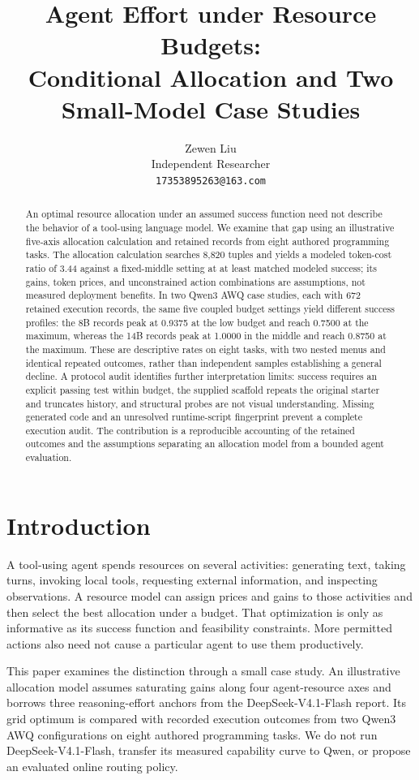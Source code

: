 \documentclass[11pt]{article}
\title{Agent Effort under Resource Budgets:\\Conditional Allocation and Two Small-Model Case Studies}
\author{Zewen Liu \\ Independent Researcher \\ \texttt{17353895263@163.com}}
\date{}
\begin{document}
\maketitle

\begin{abstract}
An optimal resource allocation under an assumed success function need not describe the behavior of a tool-using language model. We examine that gap using an illustrative five-axis allocation calculation and retained records from eight authored programming tasks. The allocation calculation searches 8,820 tuples and yields a modeled token-cost ratio of 3.44 against a fixed-middle setting at at least matched modeled success; its gains, token prices, and unconstrained action combinations are assumptions, not measured deployment benefits. In two Qwen3 AWQ case studies, each with 672 retained execution records, the same five coupled budget settings yield different success profiles: the 8B records peak at 0.9375 at the low budget and reach 0.7500 at the maximum, whereas the 14B records peak at 1.0000 in the middle and reach 0.8750 at the maximum. These are descriptive rates on eight tasks, with two nested menus and identical repeated outcomes, rather than independent samples establishing a general decline. A protocol audit identifies further interpretation limits: success requires an explicit passing test within budget, the supplied scaffold repeats the original starter and truncates history, and structural probes are not visual understanding. Missing generated code and an unresolved runtime-script fingerprint prevent a complete execution audit. The contribution is a reproducible accounting of the retained outcomes and the assumptions separating an allocation model from a bounded agent evaluation.
\end{abstract}

\section{Introduction}
A tool-using agent spends resources on several activities: generating text, taking turns, invoking local tools, requesting external information, and inspecting observations. A resource model can assign prices and gains to those activities and then select the best allocation under a budget. That optimization is only as informative as its success function and feasibility constraints. More permitted actions also need not cause a particular agent to use them productively.

This paper examines the distinction through a small case study. An illustrative allocation model assumes saturating gains along four agent-resource axes and borrows three reasoning-effort anchors from the DeepSeek-V4.1-Flash report\citep{v41flash2026}. Its grid optimum is compared with recorded execution outcomes from two Qwen3 AWQ configurations on eight authored programming tasks. We do not run DeepSeek-V4.1-Flash, transfer its measured capability curve to Qwen, or propose an evaluated online routing policy.
\end{document}

